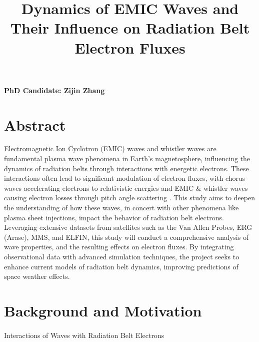 \documentclass[
  letterpaper,
  DIV=11,
  numbers=noendperiod]{scrartcl}
\title{Dynamics of EMIC Waves and Their Influence on Radiation Belt Electron Fluxes}
\author{}
\date{}
\makeatletter
\let\oldparagraph\paragraph
\renewcommand{\paragraph}{
    \@ifstar
      \xxxParagraphStar
      \xxxParagraphNoStar
  }
\newcommand{\xxxParagraphStar}[1]{\oldparagraph*{#1}\mbox{}}
\newcommand{\xxxParagraphNoStar}[1]{\oldparagraph{#1}\mbox{}}
\makeatother
\begin{document}
\maketitle

\vspace{-20truemm}

\textbf{PhD Candidate: Zijin Zhang}

\section{Abstract}\label{abstract}

Electromagnetic Ion Cyclotron (EMIC) waves and whistler waves are fundamental plasma wave phenomena in Earth's magnetosphere, influencing the dynamics of radiation belts through interactions with energetic electrons. These interactions often lead to significant modulation of electron fluxes, with chorus waves accelerating electrons to relativistic energies \citep{miyoshiRebuildingProcessOuter2003, sorathiaModelingDepletionRecovery2018} and EMIC \& whistler waves causing electron losses through pitch angle scattering \citep{summersRelativisticElectronPitchangle2003, summersTimescalesRadiationBelt2007}. This study aims to deepen the understanding of how these waves, in concert with other phenomena like plasma sheet injections, impact the behavior of radiation belt electrons. Leveraging extensive datasets from satellites such as the Van Allen Probes, ERG (Arase), MMS, and ELFIN, this study will conduct a comprehensive analysis of wave properties, and the resulting effects on electron fluxes. By integrating observational data with advanced simulation techniques, the project seeks to enhance current models of radiation belt dynamics, improving predictions of space weather effects.

\section{Background and Motivation}\label{background-and-motivation}

\paragraph{Interactions of Waves with Radiation Belt Electrons}\label{interactions-of-waves-with-radiation-belt-electrons}
\end{document}
